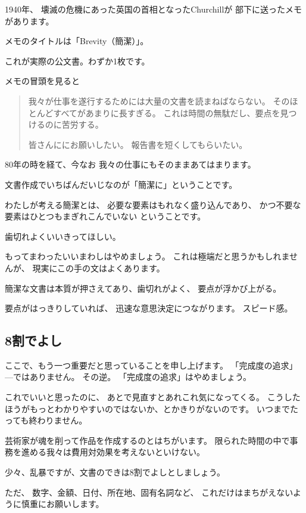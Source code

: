 \documentclass[uplatex,jis2004,dvipdfmx,14pt]{jsarticle}
\begin{document}
1940年、
壊滅の危機にあった英国の首相となったChurchillが
部下に送ったメモがあります。

メモのタイトルは「Brevity（簡潔）」。

これが実際の公文書。わずか1枚です。

メモの冒頭を見ると

\begin{quote}
我々が仕事を遂行するためには大量の文書を読まねばならない。
そのほとんどすべてがあまりに長すぎる。
これは時間の無駄だし、要点を見つけるのに苦労する。

皆さんににお願いしたい。
報告書を短くしてもらいたい。
\end{quote}



80年の時を経て、今なお
我々の仕事にもそのままあてはまります。

文書作成でいちばんだいじなのが「簡潔に」ということです。

わたしが考える簡潔とは、
必要な要素はもれなく盛り込んであり、
かつ不要な要素はひとつもまぎれこんでいない
ということです。

歯切れよくいいきってほしい。

もってまわったいいまわしはやめましょう。
これは極端だと思うかもしれませんが、
現実にこの手の文はよくあります。


簡潔な文書は本質が押さえてあり、歯切れがよく、
要点が浮かび上がる。


要点がはっきりしていれば、
迅速な意思決定につながります。
スピード感。

\subsection{8割でよし}

ここで、もう一つ重要だと思っていることを申し上げます。
「完成度の追求」---ではありません。
その逆。
「完成度の追求」はやめましょう。

これでいいと思ったのに、
あとで見直すとあれこれ気になってくる。
こうしたほうがもっとわかりやすいのではないか、とかきりがないのです。
いつまでたっても終わりません。

芸術家が魂を削って作品を作成するのとはちがいます。
限られた時間の中で事務を進める我々は費用対効果を考えないといけない。

少々、乱暴ですが、文書のできは8割でよしとしましょう。


ただ、
数字、金額、日付、所在地、固有名詞など、
これだけはまちがえないように慎重にお願いします。
\end{document}

